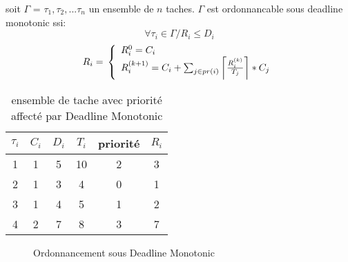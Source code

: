 \begin{theoreme}
soit $\Gamma$ = $\tau_{1},\tau_{2},. . . \tau_{n}$ un ensemble de $n$
taches.  $\Gamma$ est ordonnancable sous deadline monotonic ssi:
\begin{equation}
\forall \tau_{i} \in \Gamma / R_{i} \leq D_{i}
\end{equation}
\begin{equation}
R_{i} = \\
\left\lbrace
\begin{array}{l}
R_{i}^0=C_{i}
\\
 R_{i}^{(k+1)}=C_{i}+\sum_{j \in pr(i)}  \left \lceil 
 \frac{R_{i}^{(k)}}{T_{j}} \right \rceil * C_{j}  
\end{array}\right.
\end{equation}
\end{theoreme}

\begin{table}[h]
\begin{center}
\begin{tabular}{|c|c|c|c|c|c|}
 \hline$\tau_i$ & $C_i$ & $D_i$ & $T_i$ & priorité & $R_i$\\ 
 \hline1 & 1 & 5 & 10 & 2 & 3\\ 
 \hline2 & 1 & 3 & 4 & 0 & 1\\ 
 \hline3 & 1 & 4 & 5 & 1 & 2\\ 
 \hline4 & 2 & 7 & 8 & 3 & 7\\ 
 \hline
 \end{tabular}
\end{center}
\caption{ensemble de tache avec priorité affecté par Deadline Monotonic} \label{tab:exempleDM}
\end{table}

\begin{figure}[h]
\begin{center}
\begin{RTGrid}[height=4cm,width=12cm,labelsize=8pt,numbersize=6]{4}{10}



\end{RTGrid}
\caption{Ordonnancement sous Deadline Monotonic} \label{fig:exempleDM}
\end{center}
\end{figure}

